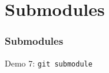 \section[Section]{Submodules}

\begin{frame}
    \frametitle{Submodules}
    \alert{Demo 7}: \texttt{git submodule}
\end{frame}
